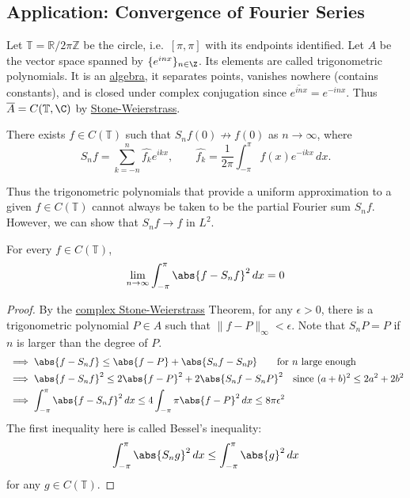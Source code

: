 \documentclass{article}
\begin{document}
\subsection{Application: Convergence of Fourier Series}
Let $\mathbb{T} = \mathbb{R}/2\pi\mathbb{Z}$ be the circle, i.e.\ $[\pi, \pi]$ with its endpoints identified.
Let $A$ be the vector space spanned by $\{e^{i n x}\}_{n \in \Z}$.
Its elements are called trigonometric polynomials.
It is an \hyperlink{def:alg}{algebra}, it separates points, vanishes nowhere (contains constants), and is closed under complex conjugation since $\overline{e^{i n x}} = e^{-i n x}$.
Thus $\overline{A} = C(\mathbb{T}, \C)$ by \hyperlink{thm:csw}{Stone-Weierstrass}.

\begin{eg}
    There exists $f \in C(\mathbb{T})$ such that $S_nf(0) \not\to f(0)$ as $n \to \infty$, where
    \begin{equation*}
        S_nf = \sum_{k = -n}^{n} \hat{f_k} e^{i k x}, \qquad \hat{f_k} = \frac{1}{2\pi} \int_{-\pi}^{\pi} f(x) e^{-i k x} \, dx.
    \end{equation*}
\end{eg}

Thus the trigonometric polynomials that provide a uniform approximation to a given $f \in C(\mathbb{T})$ cannot always be taken to be the partial Fourier sum $S_nf$.
However, we can show that $S_nf \to f$ in $L^2$.
\begin{prop}
    For every $f \in C(\mathbb{T})$,
    \begin{equation*}
        \lim_{n \to \infty} \int_{-\pi}^\pi \abs{f - S_nf}^2 \, dx = 0
    \end{equation*}
\end{prop}
\begin{proof}
    By the \hyperlink{thm:csw}{complex Stone-Weierstrass} Theorem, for any $\epsilon > 0$, there is a trigonometric polynomial $P \in A$ such that $\|f-P\|_\infty < \epsilon$.
    Note that $S_n P = P$ if $n$ is larger than the degree of $P$.
    \begin{align*}
        &\implies \abs{f - S_n f} \leq \abs{f - P} + \abs{S_n f - S_n p} \qquad \text{for $n$ large enough}\\
        &\implies \abs{f - S_n f}^2 \leq 2\abs{f - P}^2 + 2 \abs{S_n f - S_n P}^2 \quad \text{since } (a+b)^2 \leq 2a^2 + 2b^2 \\
        &\implies \int_{-\pi}^{\pi} \abs{f - S_n f}^2 \, dx \leq 4 \int_{-\pi}{\pi} \abs{f - P}^2 \, dx \leq 8 \pi \epsilon^2
    \end{align*}
    The first inequality here is called Bessel's inequality:
    \begin{equation*}
        \int_{-\pi}^\pi \abs{S_n g}^2 \, dx \leq \int_{-\pi}^\pi \abs{g}^2 \, dx
    \end{equation*}
    for any $g \in C(\mathbb{T})$.
\end{proof}
\end{document}
